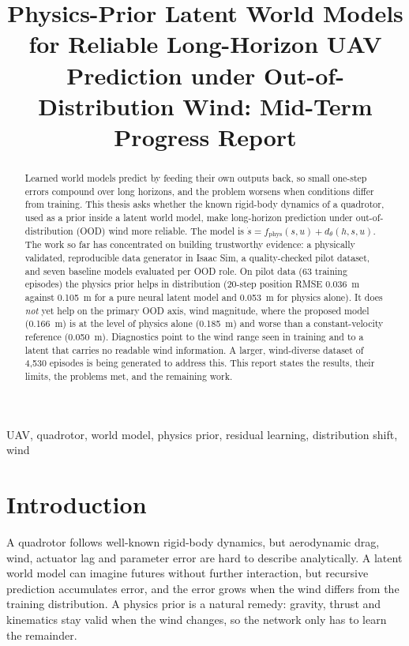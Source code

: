 \documentclass[conference]{IEEEtran}
\begin{document}
\title{Physics-Prior Latent World Models for Reliable Long-Horizon UAV Prediction under Out-of-Distribution Wind: Mid-Term Progress Report}

\author{
}
\maketitle

\begin{abstract}
Learned world models predict by feeding their own outputs back, so small one-step errors compound over long horizons, and the problem worsens when conditions differ from training. This thesis asks whether the known rigid-body dynamics of a quadrotor, used as a prior inside a latent world model, make long-horizon prediction under out-of-distribution (OOD) wind more reliable. The model is $\dot s = f_{\mathrm{phys}}(s,u) + d_\theta(h,s,u)$. The work so far has concentrated on building trustworthy evidence: a physically validated, reproducible data generator in Isaac Sim, a quality-checked pilot dataset, and seven baseline models evaluated per OOD role. On pilot data (63 training episodes) the physics prior helps in distribution (20-step position RMSE 0.036~m against 0.105~m for a pure neural latent model and 0.053~m for physics alone). It does \emph{not} yet help on the primary OOD axis, wind magnitude, where the proposed model (0.166~m) is at the level of physics alone (0.185~m) and worse than a constant-velocity reference (0.050~m). Diagnostics point to the wind range seen in training and to a latent that carries no readable wind information. A larger, wind-diverse dataset of 4,530 episodes is being generated to address this. This report states the results, their limits, the problems met, and the remaining work.
\end{abstract}

\begin{IEEEkeywords}
UAV, quadrotor, world model, physics prior, residual learning, distribution shift, wind
\end{IEEEkeywords}

\section{Introduction}
A quadrotor follows well-known rigid-body dynamics, but aerodynamic drag, wind, actuator lag and parameter error are hard to describe analytically. A latent world model can imagine futures without further interaction, but recursive prediction accumulates error, and the error grows when the wind differs from the training distribution. A physics prior is a natural remedy: gravity, thrust and kinematics stay valid when the wind changes, so the network only has to learn the remainder.
\end{document}
